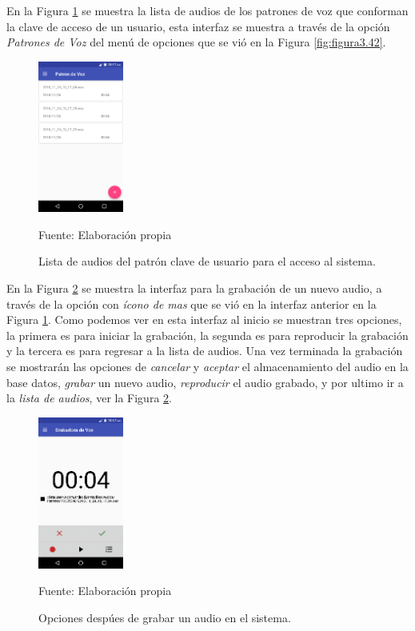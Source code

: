 \newpage
En la Figura \ref{fig:figura3.43} se muestra la lista de audios de los patrones de voz que conforman la clave de acceso de un usuario, esta interfaz se muestra a través de la opción \textit{Patrones de Voz} del menú de opciones que se vió en la Figura \ref{fig:figura3.42}.
\begin{figure}[H]
\captionsetup{justification=centering}
\begin{center}
\includegraphics[width=0.25\textwidth]{Imagenes/Cap3/image043}
\end{center}
\begin{center}
\vskip -0.5cm
\caption{\small{Lista de audios del patrón clave de usuario para el acceso al sistema.}}
\label{fig:figura3.43}
{\small{Fuente: Elaboración propia}}
\end{center}
\end{figure}
\vskip -0.5cm
En la Figura \ref{fig:figura3.45} se muestra la interfaz para la grabación de un nuevo audio, a través de la opción con \textit{ícono de mas} que se vió en la interfaz anterior en la Figura \ref{fig:figura3.43}. Como podemos ver en esta interfaz al inicio se muestran tres opciones, la primera es para iniciar la grabación, la segunda es para reproducir la grabación y la tercera es para regresar a la lista de audios. Una vez terminada la grabación se mostrarán las opciones de \textit{cancelar} y \textit{aceptar} el almacenamiento del audio en la base datos, \textit{grabar} un nuevo audio, \textit{reproducir} el audio grabado, y por ultimo ir a la \textit{lista de audios}, ver la Figura \ref{fig:figura3.45}.
\begin{figure}[H]
\captionsetup{justification=centering}
\begin{center}
\includegraphics[width=0.25\textwidth]{Imagenes/Cap3/image045}
\end{center}
\begin{center}
\vskip -0.5cm
\caption{\small{Opciones despúes de grabar un audio en el sistema.}}
\label{fig:figura3.45}
{\small{Fuente: Elaboración propia}}
\end{center}
\end{figure}
